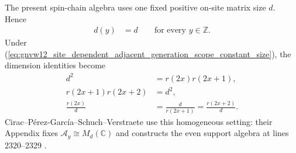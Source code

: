 \documentclass[11pt]{article}
\begin{document}
The present spin-chain algebra uses one fixed positive on-site matrix size
$d$. Hence
\begin{align}
    d(y)
     & =d
    \qquad\text{for every }y\in\mathbb Z.
    \label{eq:gnvw12_site_dependent_adjacent_generation_scope_constant_size}
\end{align}
Under
(\ref{eq:gnvw12_site_dependent_adjacent_generation_scope_constant_size}), the
dimension identities become
\begin{align}
    d^2
     & =r(2x)r(2x+1),
    \label{eq:gnvw12_site_dependent_adjacent_generation_scope_homogeneous_even} \\
    r(2x+1)r(2x+2)
     & =d^2,
    \label{eq:gnvw12_site_dependent_adjacent_generation_scope_homogeneous_odd}  \\
    \frac{r(2x)}{d}
     & =\frac{d}{r(2x+1)}
    =\frac{r(2x+2)}{d}.
    \label{eq:gnvw12_site_dependent_adjacent_generation_scope_homogeneous_ratio}
\end{align}
Cirac--P\'erez-Garc\'ia--Schuch--Verstraete use this homogeneous setting:
their Appendix fixes $\mathcal A_y\cong M_d(\mathbb C)$ and constructs the
even support algebra at lines 2320--2329
\cite{Cirac2017MPU}.
\end{document}
